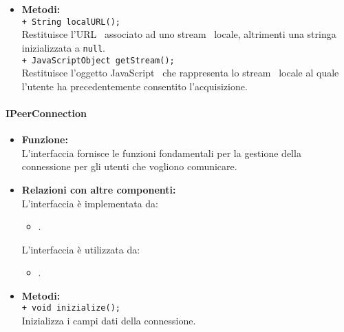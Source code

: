 {{\begin{sloppypar}
{{{\begin{itemize}
				\item[] \textbf{Metodi:}{\\
					\texttt{+ String localURL();}\\
					Restituisce l'URL\g~ associato ad uno stream\g~ locale, altrimenti una stringa inizializzata a \texttt{null}.\\

					\texttt{+ JavaScriptObject getStream();}\\
					Restituisce l'oggetto JavaScript\g~ che rappresenta lo stream\g~ locale al quale l'utente ha precedentemente consentito l'acquisizione.\\
				}
			\end{itemize}
			}
	
	

			\paragraph{IPeerConnection}\label{par:IPeerConnection}{
			\begin{itemize}
			
				\item[] \textbf{Funzione:}\\
				L'interfaccia fornisce le funzioni fondamentali per la gestione della connessione per gli utenti che vogliono comunicare.\\
			
				\item[] \textbf{Relazioni con altre componenti:}\\
					L'interfaccia è implementata da:
					\begin{itemize}
						\item[]	.
					\end{itemize} 		
					L'interfaccia è utilizzata da:
					\begin{itemize}
						\item[] .\\
					\end{itemize}
				
				\item[] \textbf{Metodi:}\\
					\texttt{+ void inizialize();}\\
					Inizializza i campi dati della connessione.\\
					

\end{itemize}}}}
\end{sloppypar}}}
